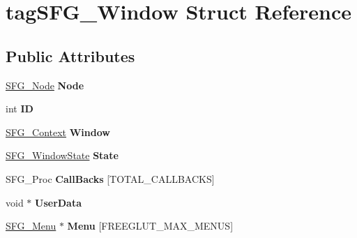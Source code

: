 \hypertarget{structtag_s_f_g___window}{}\section{tag\+S\+F\+G\+\_\+\+Window Struct Reference}
\label{structtag_s_f_g___window}
\subsection*{Public Attributes}
\begin{DoxyCompactItemize}
\item 
\hyperlink{structtag_s_f_g___node}{S\+F\+G\+\_\+\+Node} {\bfseries Node}\hypertarget{structtag_s_f_g___window_adc4ddf7a822ba1c8a70d8d40294e980d}{}\label{structtag_s_f_g___window_adc4ddf7a822ba1c8a70d8d40294e980d}

\item 
int {\bfseries ID}\hypertarget{structtag_s_f_g___window_a077ee8456067e0dedb24c3c386b0cf01}{}\label{structtag_s_f_g___window_a077ee8456067e0dedb24c3c386b0cf01}

\item 
\hyperlink{structtag_s_f_g___context}{S\+F\+G\+\_\+\+Context} {\bfseries Window}\hypertarget{structtag_s_f_g___window_a7412006027fca6391514cba2ff4f2d50}{}\label{structtag_s_f_g___window_a7412006027fca6391514cba2ff4f2d50}

\item 
\hyperlink{structtag_s_f_g___window_state}{S\+F\+G\+\_\+\+Window\+State} {\bfseries State}\hypertarget{structtag_s_f_g___window_ae267d48b0d06a0345124a846c0beba99}{}\label{structtag_s_f_g___window_ae267d48b0d06a0345124a846c0beba99}

\item 
S\+F\+G\+\_\+\+Proc {\bfseries Call\+Backs} \mbox{[}T\+O\+T\+A\+L\+\_\+\+C\+A\+L\+L\+B\+A\+C\+KS\mbox{]}\hypertarget{structtag_s_f_g___window_a03e03fc725bcefaa4b95d938c38b966a}{}\label{structtag_s_f_g___window_a03e03fc725bcefaa4b95d938c38b966a}

\item 
void $\ast$ {\bfseries User\+Data}\hypertarget{structtag_s_f_g___window_aeae44952457c44d83aa4d50b9c90e88d}{}\label{structtag_s_f_g___window_aeae44952457c44d83aa4d50b9c90e88d}

\item 
\hyperlink{structtag_s_f_g___menu}{S\+F\+G\+\_\+\+Menu} $\ast$ {\bfseries Menu} \mbox{[}F\+R\+E\+E\+G\+L\+U\+T\+\_\+\+M\+A\+X\+\_\+\+M\+E\+N\+US\mbox{]}\hypertarget{structtag_s_f_g___window_a78c0830a23cb7f5851801e65e1693f2d}{}\label{structtag_s_f_g___window_a78c0830a23cb7f5851801e65e1693f2d}


\end{DoxyCompactItemize}
